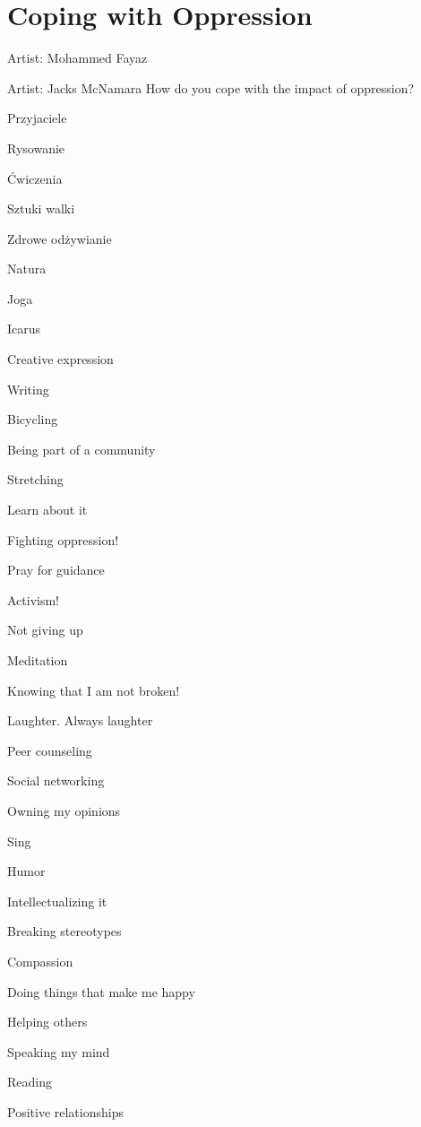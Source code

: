 \chapter{Coping with Oppression}
Artist: Mohammed Fayaz

\newpage

Artist: Jacks McNamara
How do you cope with the impact of oppression?

\begin{multicols}{2}
\begin{checkboxlist}
\item Przyjaciele
\item Rysowanie
\item Ćwiczenia
\item Sztuki walki
\item Zdrowe odżywianie
\item Natura
\item Joga
\item Icarus
\item Creative expression
\item Writing
\item Bicycling
\item Being part of a community
\item Stretching
\item Learn about it
\item Fighting oppression!
\item Pray for guidance
\item Activism!
\item Not giving up
\item Meditation
\item Knowing that I am not broken!
\item Laughter. Always laughter
\item Peer counseling
\item Social networking
\item Owning my opinions
\item Sing
\item Humor
\item Intellectualizing it
\item Breaking stereotypes
\item Compassion
\item Doing things that make me happy
\item Helping others
\item Speaking my mind
\item Reading
\item Positive relationships

\end{checkboxlist}
\end{multicols}

